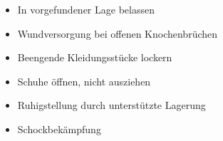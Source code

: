 \label{m:ehi-knochenbrueche}
\begin{itemize}
    \item In vorgefundener Lage belassen
    \item Wundversorgung bei offenen Knochenbrüchen
    \item Beengende Kleidungsstücke lockern
    \item Schuhe öffnen, nicht ausziehen
    \item Ruhigstellung durch unterstützte Lagerung
    \item Schockbekämpfung
\end{itemize}